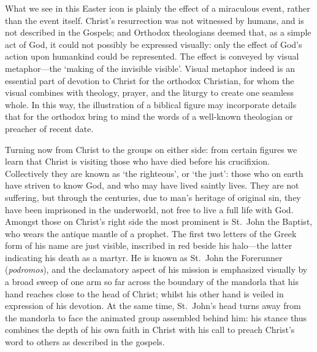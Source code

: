 \documentclass[a4paper,12pt]{article}
\begin{document}
What we see in this Easter icon is plainly the effect of a miraculous
event, rather than the event itself.  Christ’s resurrection was not
witnessed by humans, and is not described in the Gospels; and Orthodox
theologians deemed that, as a simple act of God, it could not possibly
be expressed visually: only the effect of God’s action upon humankind
could be represented.  The effect is conveyed by visual metaphor---the
‘making of the invisible visible’.  Visual metaphor indeed is an
essential part of devotion to Christ for the orthodox Christian, for
whom the visual combines with theology, prayer, and the liturgy to
create one seamless whole.  In this way, the illustration of a
biblical figure may incorporate details that for the orthodox bring to
mind the words of a well-known theologian or preacher of recent date.

Turning now from Christ to the groups on either side: from certain
figures we learn that Christ is visiting those who have died before
his crucifixion.  Collectively they are known as ‘the righteous’, or
‘the just’: those who on earth have striven to know God, and who may
have lived saintly lives.  They are not suffering, but through the
centuries, due to man’s heritage of original sin, they have been
imprisoned in the underworld, not free to live a full life with God.
Amongst those on Christ’s right side the most prominent is St.~John
the Baptist, who wears the antique mantle of a prophet.  The first two
letters of the Greek form of his name are just visible, inscribed in
red beside his halo---the latter indicating his death as a martyr.  He
is known as St.~John the Forerunner ({\it podromos}), and the
declamatory aspect of his mission is emphasized visually by a broad
sweep of one arm so far across the boundary of the mandorla that his
hand reaches close to the head of Christ; whilst his other hand is
veiled in expression of his devotion.  At the same time, St.~John’s
head turns away from the mandorla to face the animated group assembled
behind him: his stance thus combines the depth of his own faith in
Christ with his call to preach Christ’s word to others as described in
the gospels.
\end{document}
